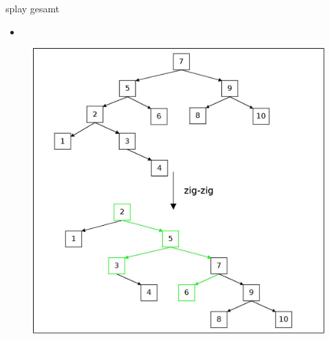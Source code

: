 \documentclass[11pt]{beamer}
\begin{document}
	\begin{frame}{splay gesamt}
		
		\begin{itemize}
			\item  {}
		\end{itemize}
		\begin{figure}[h]
			\centering
			\includegraphics[height=0.5\textwidth]{"bilder/splayGesamt2"}
		\end{figure}	
	\end{frame}
	
\end{document}

